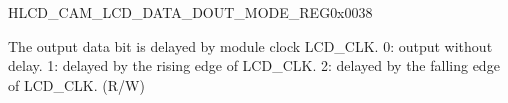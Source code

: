 \begin{register}{H}{LCD\_CAM\_LCD\_DATA\_DOUT\_MODE\_REG}{0x{}0038}\label{regdesc:LCDCAMLCDDATADOUTMODEREG}
%
%
%
%
%
%
%
%
%
%
%
%
%
%
%
%
\regnewline%
\begin{regdesc}\begin{reglist}
\label{fielddesc:LCDCAMDOUT0MODE}\item [LCD\_CAM\_DOUT\regindex{n}\_MODE (\regindex{n} = 0 - 15)] The output data bit  is delayed by module clock LCD\_CLK. 0: output without delay. 1: delayed by the rising edge of LCD\_CLK. 2: delayed by the falling edge of LCD\_CLK. (R/W)
\end{reglist}\end{regdesc}
\end{register}


